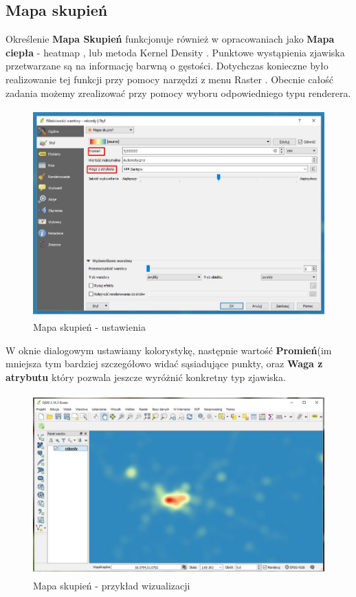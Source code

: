 \documentclass[12pt,a4paper]{book}
\begin{document}
\subsection{Mapa skupień}
Określenie \textbf{Mapa Skupień} funkcjonuje również w opracowaniach jako \textbf{Mapa ciepła} - heatmap \cite{Pettit2012}, lub metoda Kernel Density \cite{Meier2014}. Punktowe wystąpienia zjawiska przetwarzane są na informację barwną o gęstości. Dotychczas konieczne było realizowanie tej funkcji przy pomocy narzędzi z menu  Raster . Obecnie całość zadania możemy zrealizować przy pomocy wyboru odpowiedniego typu renderera.
\begin{figure}[!ht]
	\centering
	\includegraphics[height=8cm]{007-heatmap-u.jpg}
	\caption{Mapa skupień - ustawienia}
\end{figure}

W oknie dialogowym ustawiamy kolorystykę, następnie wartość \textbf{Promień}(im mniejsza tym bardziej szczegółowo widać sąsiadujące punkty, oraz \textbf{Waga z atrybutu} który pozwala jeszcze wyróżnić konkretny typ zjawiska.
\begin{figure}[!ht]
	\centering
	\includegraphics[height=7cm]{007-heatmap-w.jpg}
	\caption{Mapa skupień - przykład wizualizacji}
\end{figure}
\end{document}
